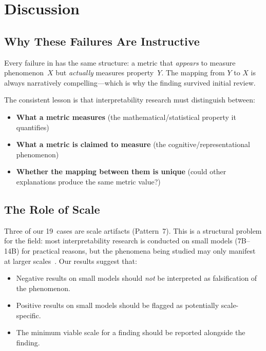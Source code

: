 \documentclass[11pt,a4paper]{article}
\begin{document}
\section{Discussion}
\label{sec:discussion}

\subsection{Why These Failures Are Instructive}

Every failure in  has the same structure: a metric that
\emph{appears} to measure phenomenon~$X$ but \emph{actually} measures
property~$Y$. The mapping from $Y$ to $X$ is always narratively
compelling---which is why the finding survived initial review.

The consistent lesson is that interpretability research must distinguish
between:
\begin{itemize}[nosep]
    \item \textbf{What a metric measures} (the mathematical/statistical
          property it quantifies)
    \item \textbf{What a metric is claimed to measure} (the
          cognitive/representational phenomenon)
    \item \textbf{Whether the mapping between them is unique} (could other
          explanations produce the same metric value?)
\end{itemize}

\subsection{The Role of Scale}

Three of our 19~cases are scale artifacts (Pattern~7). This is a
structural problem for the field: most interpretability research is
conducted on small models (7B--14B) for practical reasons, but the
phenomena being studied may only manifest at larger
scales~\citep{wei2022emergent}. Our results suggest that:
\begin{itemize}[nosep]
    \item Negative results on small models should \emph{not} be
          interpreted as falsification of the phenomenon.
    \item Positive results on small models should be flagged as
          potentially scale-specific.
    \item The minimum viable scale for a finding should be reported
          alongside the finding.
\end{itemize}
\end{document}
